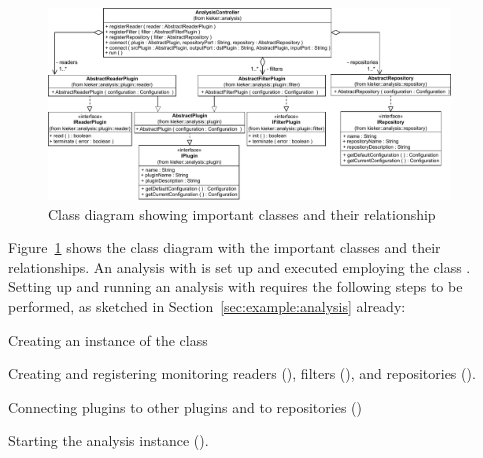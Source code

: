 
\begin{figure}\centering
\includegraphics[width=0.95\textwidth]{images/kieker_AnalysisControlleruserguide-modified}
\caption{Class diagram showing important \KiekerAnalysisPart{} classes and their relationship}
\label{fig:analysisController:classdiagram}
\end{figure}

\pagebreak

\noindent Figure~\ref{fig:analysisController:classdiagram} shows the class diagram %
with the important \KiekerAnalysisPart{} classes and their relationships. %
An analysis with \KiekerAnalysisPart{} is set up and executed employing %
the class . %
Setting up and running an analysis with \KiekerAnalysisPart{} requires the %
following steps to be performed, as sketched in Section~\ref{sec:example:analysis} already:

\medskip

\begin{compactenum}
\item Creating an instance of the  class
\item Creating and registering monitoring readers (),
filters (), and repositories ().
\item Connecting plugins to other plugins and to repositories ()
\item Starting the analysis instance ().
\end{compactenum}

\medskip

